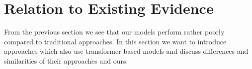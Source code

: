 \chapter{Relation to Existing Evidence}
\label{chp:relation_to_existing_evidence}
From the previous section we see that our models perform rather poorly compared to traditional approaches.
In this section we want to introduce approaches which also use transformer based models and discuss differences and similarities of their approaches and ours.



